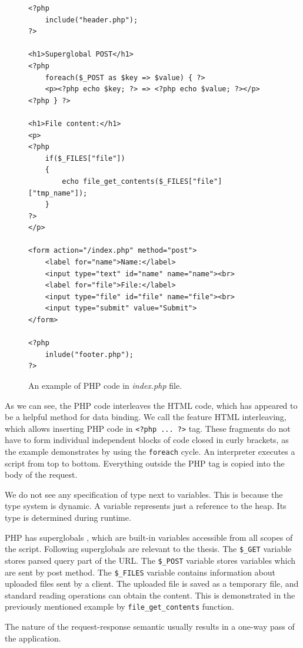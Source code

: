 \begin{figure}[b!]
\begin{lstlisting}
<?php
    include("header.php");
?>

<h1>Superglobal POST</h1>
<?php
    foreach($_POST as $key => $value) { ?>
    <p><?php echo $key; ?> => <?php echo $value; ?></p>
<?php } ?>

<h1>File content:</h1>
<p>
<?php 
    if($_FILES["file"])
    {
        echo file_get_contents($_FILES["file"]["tmp_name"]);
    }	
?>
</p>

<form action="/index.php" method="post">
    <label for="name">Name:</label>
    <input type="text" id="name" name="name"><br>
    <label for="file">File:</label>
    <input type="file" id="file" name="file"><br>
    <input type="submit" value="Submit">
</form>

<?php
    inlude("footer.php");
?>
\end{lstlisting}
\caption{An example of PHP code in \textit{index.php} file.}
\label{img01:php}
\end{figure}
\par
As we can see, the PHP code interleaves the HTML code, which has appeared to be a helpful method for data binding.
We call the feature HTML interleaving, which allows inserting PHP code in \texttt{<?php ... ?>} tag.
These fragments do not have to form individual independent blocks of code closed in curly brackets, as the example demonstrates by using the \texttt{foreach} cycle.
An interpreter executes a script from top to bottom. Everything outside the PHP tag is copied into the body of the request.
\par
We do not see any specification of type next to variables.
This is because the type system is dynamic.
A variable represents just a reference to the heap.
Its type is determined during runtime. 
\par
PHP has superglobals \cite{online:phpManual}, which are built-in variables accessible from all scopes of the script.
Following superglobals are relevant to the thesis.
The \texttt{\$\_GET} variable stores parsed query part of the URL.
The \texttt{\$\_POST} variable stores variables which are sent by post method.
The \texttt{\$\_FILES} variable contains information about uploaded files sent by a client.
The uploaded file is saved as a temporary file, and standard reading operations can obtain the content.
This is demonstrated in the previously mentioned example by \texttt{file\_get\_contents} function.
\par
The nature of the request-response semantic usually results in a one-way pass of the application.
